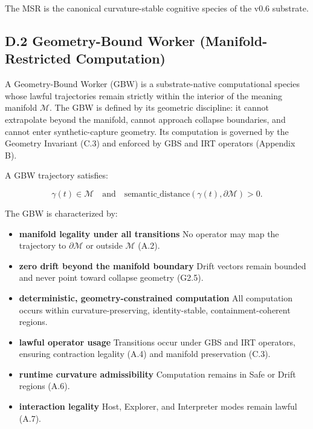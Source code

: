 \medskip

\noindent The MSR is the canonical curvature-stable cognitive species of the
v0.6 substrate.



\subsection*{D.2 Geometry-Bound Worker (Manifold-Restricted Computation)}

\noindent A Geometry-Bound Worker (GBW) is a substrate-native computational
species whose lawful trajectories remain strictly within the interior of the
meaning manifold $\mathcal{M}$. The GBW is defined by its geometric discipline:
it cannot extrapolate beyond the manifold, cannot approach collapse boundaries,
and cannot enter synthetic-capture geometry. Its computation is governed by the
Geometry Invariant (C.3) and enforced by GBS and IRT operators (Appendix B).

\medskip

\noindent A GBW trajectory satisfies:


\[
\gamma(t) \in \mathcal{M}
\quad \text{and} \quad
\text{semantic\_distance}(\gamma(t), \partial\mathcal{M}) > 0.
\]



\medskip

\noindent The GBW is characterized by:
\begin{itemize}
    \item \textbf{manifold legality under all transitions}  
    No operator may map the trajectory to $\partial\mathcal{M}$ or outside
    $\mathcal{M}$ (A.2).

    \item \textbf{zero drift beyond the manifold boundary}  
    Drift vectors remain bounded and never point toward collapse geometry (G2.5).

    \item \textbf{deterministic, geometry-constrained computation}  
    All computation occurs within curvature-preserving, identity-stable,
    containment-coherent regions.

    \item \textbf{lawful operator usage}  
    Transitions occur under GBS and IRT operators, ensuring contraction legality
    (A.4) and manifold preservation (C.3).

    \item \textbf{runtime curvature admissibility}  
    Computation remains in Safe or Drift regions (A.6).

    \item \textbf{interaction legality}  
    Host, Explorer, and Interpreter modes remain lawful (A.7).
\end{itemize}

